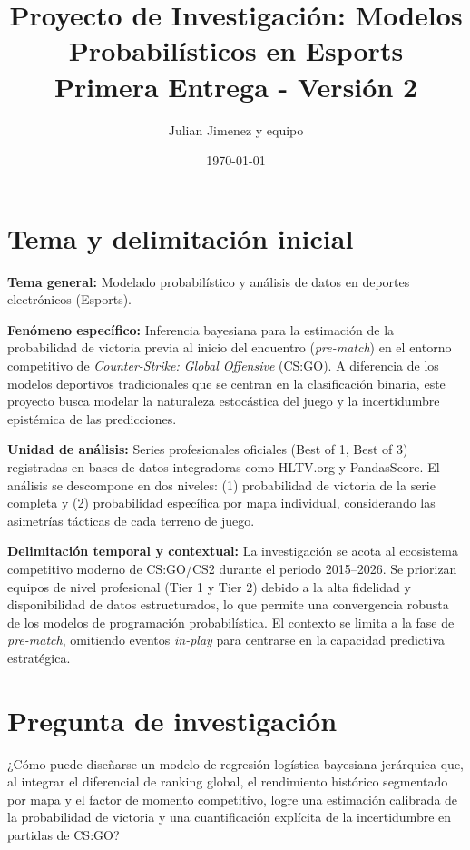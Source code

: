 \documentclass[12pt,a4paper]{article}
\title{\textbf{Proyecto de Investigación: Modelos Probabilísticos en Esports}\\ \Large Primera Entrega - Versión 2}
\author{Julian Jimenez y equipo}
\date{\today}
\begin{document}
\maketitle

\section{Tema y delimitación inicial}

\textbf{Tema general:} Modelado probabilístico y análisis de datos en deportes electrónicos (Esports).

\textbf{Fenómeno específico:} Inferencia bayesiana para la estimación de la probabilidad de victoria previa al inicio del encuentro (\textit{pre-match}) en el entorno competitivo de \textit{Counter-Strike: Global Offensive} (CS:GO). A diferencia de los modelos deportivos tradicionales que se centran en la clasificación binaria, este proyecto busca modelar la naturaleza estocástica del juego y la incertidumbre epistémica de las predicciones.

\textbf{Unidad de análisis:} Series profesionales oficiales (Best of 1, Best of 3) registradas en bases de datos integradoras como HLTV.org y PandasScore. El análisis se descompone en dos niveles: (1) probabilidad de victoria de la serie completa y (2) probabilidad específica por mapa individual, considerando las asimetrías tácticas de cada terreno de juego.

\textbf{Delimitación temporal y contextual:} La investigación se acota al ecosistema competitivo moderno de CS:GO/CS2 durante el periodo 2015--2026. Se priorizan equipos de nivel profesional (Tier 1 y Tier 2) debido a la alta fidelidad y disponibilidad de datos estructurados, lo que permite una convergencia robusta de los modelos de programación probabilística. El contexto se limita a la fase de \textit{pre-match}, omitiendo eventos \textit{in-play} para centrarse en la capacidad predictiva estratégica.

\section{Pregunta de investigación}

¿Cómo puede diseñarse un modelo de regresión logística bayesiana jerárquica que, al integrar el diferencial de ranking global, el rendimiento histórico segmentado por mapa y el factor de momento competitivo, logre una estimación calibrada de la probabilidad de victoria y una cuantificación explícita de la incertidumbre en partidas de CS:GO?
\end{document}
